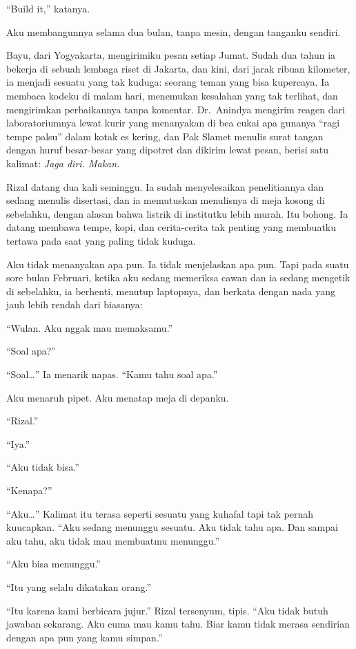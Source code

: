 \documentclass[11pt,twoside,openany]{book}
\makeatletter
\newcommand{\scenebreak}{\par\vspace{0.9em}{\centering\textsc{*\hspace{0.7em}*\hspace{0.7em}*}\par}\vspace{0.9em}\@afterindentfalse\@afterheading}
\makeatother
\begin{document}
``Build it,'' katanya.

\scenebreak
Aku membangunnya selama dua bulan, tanpa mesin, dengan tanganku sendiri.

Bayu, dari Yogyakarta, mengirimiku pesan setiap Jumat. Sudah dua tahun ia bekerja di sebuah lembaga riset di Jakarta, dan kini, dari jarak ribuan kilometer, ia menjadi sesuatu yang tak kuduga: seorang teman yang bisa kupercaya. Ia membaca kodeku di malam hari, menemukan kesalahan yang tak terlihat, dan mengirimkan perbaikannya tanpa komentar. Dr.~Anindya mengirim reagen dari laboratoriumnya lewat kurir yang menanyakan di bea cukai apa gunanya ``ragi tempe palsu'' dalam kotak es kering, dan Pak Slamet menulis surat tangan dengan huruf besar-besar yang dipotret dan dikirim lewat pesan, berisi satu kalimat: \emph{Jaga diri. Makan.}

Rizal datang dua kali seminggu. Ia sudah menyelesaikan penelitiannya dan sedang menulis disertasi, dan ia memutuskan menulisnya di meja kosong di sebelahku, dengan alasan bahwa listrik di institutku lebih murah. Itu bohong. Ia datang membawa tempe, kopi, dan cerita-cerita tak penting yang membuatku tertawa pada saat yang paling tidak kuduga.

Aku tidak menanyakan apa pun. Ia tidak menjelaskan apa pun. Tapi pada suatu sore bulan Februari, ketika aku sedang memeriksa cawan dan ia sedang mengetik di sebelahku, ia berhenti, menutup laptopnya, dan berkata dengan nada yang jauh lebih rendah dari biasanya:

``Wulan. Aku nggak mau memaksamu.''

``Soal apa?''

``Soal\ldots{}'' Ia menarik napas. ``Kamu tahu soal apa.''

Aku menaruh pipet. Aku menatap meja di depanku.

``Rizal.''

``Iya.''

``Aku tidak bisa.''

``Kenapa?''

``Aku\ldots{}'' Kalimat itu terasa seperti sesuatu yang kuhafal tapi tak pernah kuucapkan. ``Aku sedang menunggu sesuatu. Aku tidak tahu apa. Dan sampai aku tahu, aku tidak mau membuatmu menunggu.''

``Aku bisa menunggu.''

``Itu yang selalu dikatakan orang.''

``Itu karena kami berbicara jujur.'' Rizal tersenyum, tipis. ``Aku tidak butuh jawaban sekarang. Aku cuma mau kamu tahu. Biar kamu tidak merasa sendirian dengan apa pun yang kamu simpan.''
\end{document}
